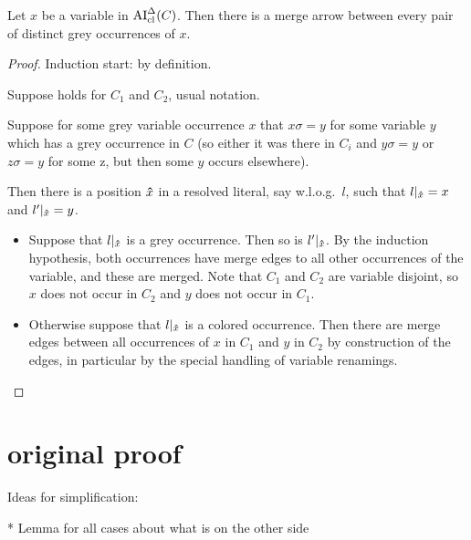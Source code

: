 \documentclass[,%
	paper=a4,%
	DIV11, %
	twoside=false,%
	liststotoc,
	bibtotoc,
	draft=false,%
	numbers=noendperiod
]{scrartcl}
\begin{document}
\begin{lemma}
	\label{lemma:arrow_from_grey_to_grey}
	Let $x$ be a variable in $\operatorname{AI}_\mathrm{cl}^\Delta(C)$.
	Then there is a merge arrow between every pair of distinct grey occurrences of $x$.
\end{lemma}
\begin{proof}
	Induction start: by definition.

	Suppose holds for $C_1$ and $C_2$, usual notation.

	Suppose for some grey variable occurrence $x$ that $x\sigma = y$ for some variable $y$ which has a grey occurrence in $C$ (so either it was there in $C_i$ and $y\sigma = y$ or $z\sigma = y$ for some z,  but then some $y$ occurs elsewhere). 

	Then there is a position $\bm\hat x$ in a resolved literal, say w.l.o.g.\ $l$, such that $l|_{\bm\hat x} = x$ and $l'|_{\bm\hat x} = y$.

	\begin{itemize}
		\item
			Suppose that $l|_{\bm\hat x}$ is a grey occurrence.
			Then so is $l'|_{\bm\hat x}$.
			By the induction hypothesis, both occurrences have merge edges to all other occurrences of the variable, and these are merged.
			Note that $C_1$ and $C_2$ are variable disjoint, so $x$ does not occur in $C_2$ and $y$ does not occur in $C_1$.

		\item
			Otherwise suppose that $l|_{\bm\hat x}$ is a colored occurrence.
			Then there are merge edges between all occurrences of $x$ in $C_1$ and $y$ in $C_2$ by construction of the edges, in particular by the special handling of variable renamings.
			\qedhere
	\end{itemize}

\end{proof}

\section{original proof}

Ideas for simplification:

* Lemma for all cases about what is on the other side
\end{document}
